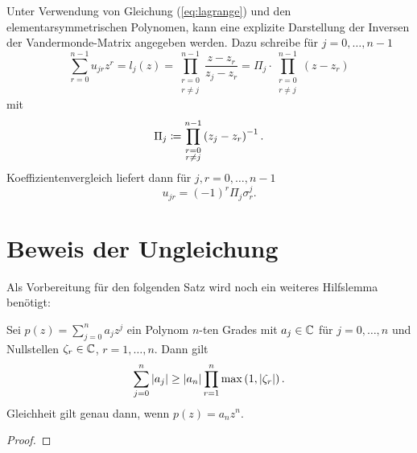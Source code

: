 \begin{remark}
    Unter Verwendung von Gleichung (\ref{eq:lagrange}) und den
    elementarsymmetrischen Polynomen, kann eine explizite Darstellung der
    Inversen der Vandermonde-Matrix angegeben werden.
    Dazu schreibe für $j = 0, \dots, n-1$
    \begin{equation*}
        \sum_{r = 0}^{n-1} u_{jr} z^{r}
        = l_j(z)
        = \prod_{\substack{r=0\\ r \neq j}}^{n-1} \frac{z - z_r}{z_j - z_r}
        = \Pi_j \cdot \prod_{\substack{r=0\\ r \neq j}}^{n-1} \left( z - z_r \right)
    \end{equation*}
    mit
    \begin{equation}
        \label{def:pi_j}
        \Pi_j \coloneqq \prod_{\substack{r=0\\ r \neq j}}^{n-1} \left( z_j - z_r \right)^{-1}.
    \end{equation}
    Koeffizientenvergleich liefert dann für $j, r = 0, \dots, n-1$
    \begin{equation}
        \label{eq:explicit_inverse_vandermonde}
        u_{jr} = (-1)^{r} \Pi_j \sigma_{r}^{j}.
    \end{equation}
\end{remark}

\section{Beweis der Ungleichung}

Als Vorbereitung für den folgenden Satz wird noch ein weiteres Hilfslemma benötigt:

\begin{lemma}
    \label{lemma:polynom_coefficient_sum_inequality}
    Sei $p(z) = \sum_{j = 0}^{n} a_j z^j$ ein Polynom $n$-ten Grades mit
    $a_j \in \mathbb{C}$ für $j = 0, \dots, n$ und Nullstellen
    $\zeta_r \in \mathbb{C}$, $r = 1, \dots, n$.
    Dann gilt
    \begin{equation}
        \label{eq:polynom_coefficient_sum_inequality}
        \sum_{j=0}^{n} \left\lvert a_j \right\rvert \geq \left\lvert a_n \right\rvert \prod_{r=1}^{n} \max \left(1, \left\lvert \zeta_r \right\rvert \right).
    \end{equation}
    Gleichheit gilt genau dann, wenn $p(z) = a_n z^n$.
\end{lemma}

\begin{proof}
\end{proof}

